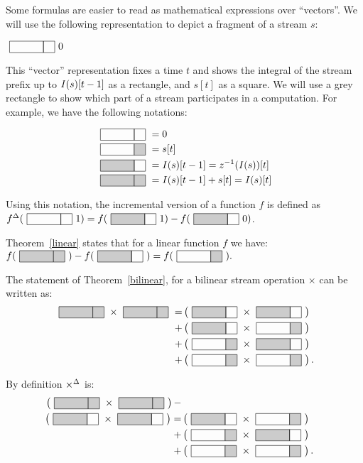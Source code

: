 Some formulas are easier to read as mathematical expressions over ``vectors''.
We will use the following representation to depict a fragment of a stream $s$:

$\strm{0}{0}$

This ``vector'' representation fixes a time $t$ and shows the integral of the stream prefix
up to $\mathit{I}(s)[t-1]$ as a rectangle, and $s[t]$ as a square.  We will use a grey rectangle to
show which part of a stream participates in a computation.  For example, we have the following
notations:

$$
\begin{aligned}
\strm{0 0} &= 0 \\
\strm{0 1} &= s[t] \\
\strm{1 0} &= \I(s)[t-1] = \zm(\I(s))[t] \\
\strm{1 1} &= \I(s)[t-1] + s[t] = \I(s)[t]
\end{aligned}
$$

Using this notation, the incremental version of a function $f$ is defined
as $\inc{f}(\strm{0}{1}) = f(\strm{1}{1}) - f(\strm{1}{0})$.

Theorem~\ref{linear} states that for a linear function $f$ we have: \\
$f(\strm{1 1}) - f(\strm{1 0}) = f(\strm{0 1}).$

The statement of Theorem~\ref{bilinear}, for a bilinear stream operation
$\times$ can be written as:
$$
\begin{aligned}
\strm{1 1} \times \strm{1 1} = &
\matmult{\strm{1 0}}{\strm{1 0}} \\ + &
\matmult{\strm{1 0}}{\strm{0 1}} \\ + &
\matmult{\strm{0 1}}{\strm{1 0}} \\ + &
\matmult{\strm{0 1}}{\strm{0 1}}.
\end{aligned}
$$

By definition ${\times}^{\Delta}$ is:
$$
\begin{aligned}
\matmult{\strm{1 1}}{\strm{1 1}} - \\
\matmult{\strm{1 0}}{\strm{1 0}} = &
\matmult{\strm{1 0}}{\strm{0 1}} \\ + &
\matmult{\strm{0 1}}{\strm{1 0}} \\ + &
\matmult{\strm{0 1}}{\strm{0 1}}.
\end{aligned}
$$
